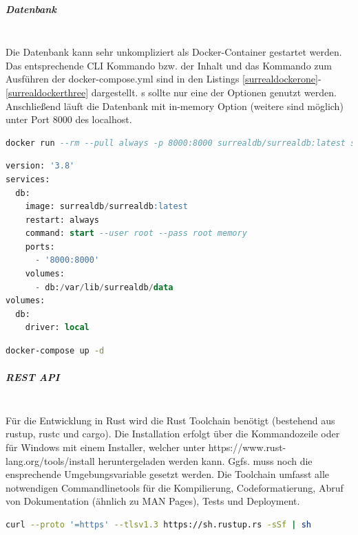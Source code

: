 \documentclass[notitlepage, hidelinks]{article}
\begin{document}
\subparagraph{Datenbank} \mbox{} \\
Die Datenbank kann sehr unkompliziert als Docker-Container gestartet werden. Das entsprechende CLI Kommando bzw. der Inhalt und das Kommando zum Ausführen der docker-compose.yml sind in den Listings \ref{surrealdockerone}-\ref{surrealdockerthree} dargestellt. s sollte nur eine der Optionen genutzt werden. Anschließend läuft die Datenbank mit in-memory Option (weitere sind möglich) unter Port 8000 des localhost.

\begin{lstlisting}[language=SQL,frame=single,caption=CLI Command zum Starten des Datenbankcontainers,label=surrealdockerone]
docker run --rm --pull always -p 8000:8000 surrealdb/surrealdb:latest start
\end{lstlisting}

\begin{lstlisting}[language=SQL,frame=single,caption=Alternative mit docker-compose zum Starten des Datenbankcontainers,label=surrealdockertwo]
version: '3.8'
services:
  db:
    image: surrealdb/surrealdb:latest
    restart: always
    command: start --user root --pass root memory
    ports:
      - '8000:8000'
    volumes: 
      - db:/var/lib/surrealdb/data
volumes:
  db:
    driver: local
\end{lstlisting}

\begin{lstlisting}[language=bash,frame=single,caption=CLI Command zum Ausführen der docker-compose Datei. Das Kommando muss im Verzeichnis ausgeführt werden\, in dem die Datei liegt\, oder der Pfad der Datei über die flag --f spezifiziert werden,label=surrealdockerthree]
docker-compose up -d
\end{lstlisting}

\subparagraph{REST API} \mbox{} \\
Für die Entwicklung in Rust wird die Rust Toolchain benötigt (bestehend aus rustup, rustc und cargo). Die Installation erfolgt über die Kommandozeile oder für Windows mit einem Installer, welcher unter https://www.rust-lang.org/tools/install heruntergeladen werden kann. Ggfs. muss noch die ensprechende Umgebungsvariable gesetzt werden. Die Toolchain umfasst alle notwendigen Commandlinetools für die Kompilierung, Codeformatierung, Abruf von Dokumentation (ähnlich zu MAN Pages), Tests und Deployment. 

\begin{lstlisting}[language=bash,frame=single,caption=CLI Command zur Installation von Rust in Linux und macOS,label=rustinstallationone]
curl --proto '=https' --tlsv1.3 https://sh.rustup.rs -sSf | sh
\end{lstlisting}
\end{document}
